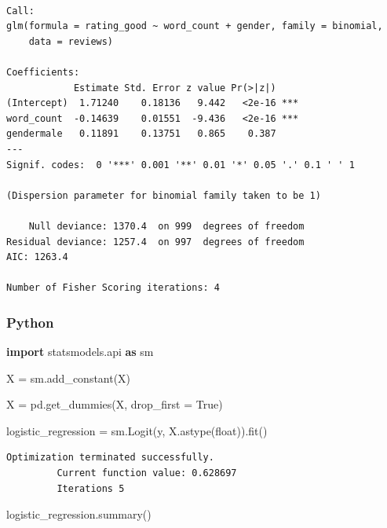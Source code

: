 \documentclass[
  letterpaper,
]{krantz}
\newenvironment{Shaded}{}{}
\newcommand{\BuiltInTok}[1]{\textcolor[rgb]{0.00,0.50,0.00}{#1}}
\newcommand{\ImportTok}[1]{\textcolor[rgb]{0.00,0.50,0.00}{\textbf{#1}}}
\newcommand{\NormalTok}[1]{#1}
\newcommand{\OperatorTok}[1]{\textcolor[rgb]{0.40,0.40,0.40}{#1}}
\newcommand{\VariableTok}[1]{\textcolor[rgb]{0.10,0.09,0.49}{#1}}
\begin{document}
\begin{verbatim}

Call:
glm(formula = rating_good ~ word_count + gender, family = binomial, 
    data = reviews)

Coefficients:
            Estimate Std. Error z value Pr(>|z|)    
(Intercept)  1.71240    0.18136   9.442   <2e-16 ***
word_count  -0.14639    0.01551  -9.436   <2e-16 ***
gendermale   0.11891    0.13751   0.865    0.387    
---
Signif. codes:  0 '***' 0.001 '**' 0.01 '*' 0.05 '.' 0.1 ' ' 1

(Dispersion parameter for binomial family taken to be 1)

    Null deviance: 1370.4  on 999  degrees of freedom
Residual deviance: 1257.4  on 997  degrees of freedom
AIC: 1263.4

Number of Fisher Scoring iterations: 4
\end{verbatim}

\subsubsection{Python}

\begin{Shaded}
\begin{Highlighting}[]
\ImportTok{import}\NormalTok{ statsmodels.api }\ImportTok{as}\NormalTok{ sm}

\NormalTok{X }\OperatorTok{=}\NormalTok{ sm.add\_constant(X)}

\NormalTok{X }\OperatorTok{=}\NormalTok{ pd.get\_dummies(X, drop\_first }\OperatorTok{=} \VariableTok{True}\NormalTok{)}

\NormalTok{logistic\_regression }\OperatorTok{=}\NormalTok{ sm.Logit(y, X.astype(}\BuiltInTok{float}\NormalTok{)).fit()}
\end{Highlighting}
\end{Shaded}

\begin{verbatim}
Optimization terminated successfully.
         Current function value: 0.628697
         Iterations 5
\end{verbatim}

\begin{Shaded}
\begin{Highlighting}[]
\NormalTok{logistic\_regression.summary()}
\end{Highlighting}
\end{Shaded}
\end{document}
